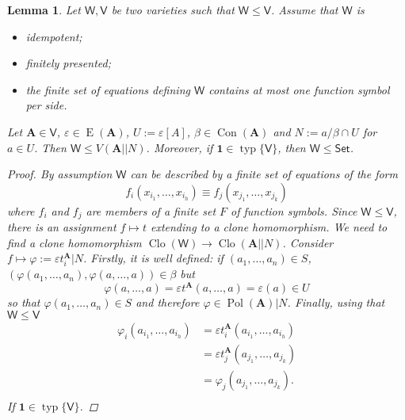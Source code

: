 \documentclass{amsart}
\theoremstyle{plain}
\newtheorem{lemma}[theorem]{Lemma}
\theoremstyle{definition}
\theoremstyle{remark}
\def\phi{\varphi}
\def\epsilon{\varepsilon}
\DeclareMathOperator{\Clo}{Clo}
\DeclareMathOperator{\Con}{Con}
\DeclareMathOperator{\Pol}{Pol}
\DeclareMathOperator{\typ}{typ}
\DeclareMathOperator{\Id}{E}
\begin{document}
\begin{lemma}
    Let $\mathsf{W}, \mathsf{V}$ be two varieties such that $\mathsf{W} \le \mathsf{V}$. 
    Assume that $\mathsf{W}$ is 
    \begin{itemize}
        \item idempotent; 
        \item finitely presented; 
        \item the finite set of equations defining $\mathsf{W}$ contains at most one function symbol per side. 
    \end{itemize}
    Let $\mathbf{A} \in \mathsf{V}$, $\epsilon \in \Id(\mathbf{A})$, $U:=\epsilon[A]$, $\beta \in \Con(\mathbf{A})$ and $N:=a/\beta \cap U$ for $a \in U$. 
    Then $\mathsf{W} \le V(\mathbf{A}||N)$. 
    Moreover, if $\mathbf{1} \in \typ\{\mathsf{V}\}$, then $\mathsf{W} \le \mathsf{Set}$. 
    \begin{proof}
        By assumption $\mathsf{W}$ can be described by a finite set of equations of the form 
        \begin{equation}
            f_i(x_{i_1}, \ldots, x_{i_h}) \equiv f_j(x_{j_1}, \ldots, x_{j_k})
        \end{equation}
        where $f_i$ and $f_j$ are members of a finite set $F$ of function symbols. 
        Since $\mathsf{W} \le  \mathsf{V}$, there is an assignment $f \mapsto t$ extending to a clone homomorphism. 
        We need to find a clone homomorphism $\Clo(\mathsf{W}) \to \Clo(\mathbf{A}||N)$. 
        Consider $f \mapsto \phi:=\epsilon t_i^\mathbf{A} |N$. 
        Firstly, it is well defined: if $(a_1, \ldots, a_n) \in S$, $(\phi(a_1, \ldots, a_n), \phi(a, \ldots, a)) \in \beta$ but 
        \begin{equation*}
            \phi(a, \ldots, a) = \epsilon t^\mathbf{A} (a, \ldots, a) = \epsilon(a) \in U
        \end{equation*}
        so that $\phi(a_1, \ldots, a_n) \in S$ and therefore $\phi \in \Pol(\mathbf{A})|N$. 
        Finally, using that $\mathsf{W} \le  \mathsf{V}$
        \begin{align*}
            \phi_i(a_{i_1}, \ldots, a_{i_h}) & = \epsilon t_i^\mathbf{A} (a_{i_1}, \ldots, a_{i_h}) \\
            & = \epsilon t_j^\mathbf{A} (a_{j_1}, \ldots, a_{j_k})\\
            & = \phi_j(a_{j_1}, \ldots, a_{j_k}) \text{.} \\
        \end{align*} 
        If $\mathbf{1} \in \typ\{\mathsf{V}\}$. 

\end{proof}
\end{lemma}
\end{document}
